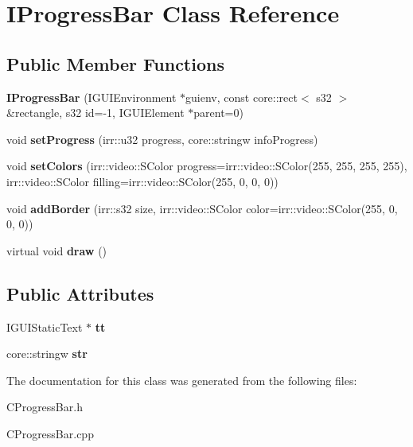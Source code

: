\hypertarget{class_i_progress_bar}{
\section{IProgressBar Class Reference}
\label{class_i_progress_bar}
}
\subsection*{Public Member Functions}
\begin{DoxyCompactItemize}
\item 
\hypertarget{class_i_progress_bar_a8fe09573b6c97fe1b82949493184a569}{
{\bfseries IProgressBar} (IGUIEnvironment $\ast$guienv, const core::rect$<$ s32 $>$ \&rectangle, s32 id=-\/1, IGUIElement $\ast$parent=0)}
\label{class_i_progress_bar_a8fe09573b6c97fe1b82949493184a569}

\item 
\hypertarget{class_i_progress_bar_a0178f12cda52d2e77b2d981518967c47}{
void {\bfseries setProgress} (irr::u32 progress, core::stringw infoProgress)}
\label{class_i_progress_bar_a0178f12cda52d2e77b2d981518967c47}

\item 
\hypertarget{class_i_progress_bar_abdfe9eec3acf019519790a0d7aefb1b6}{
void {\bfseries setColors} (irr::video::SColor progress=irr::video::SColor(255, 255, 255, 255), irr::video::SColor filling=irr::video::SColor(255, 0, 0, 0))}
\label{class_i_progress_bar_abdfe9eec3acf019519790a0d7aefb1b6}

\item 
\hypertarget{class_i_progress_bar_a64be7102178425c71475ecbbaef34583}{
void {\bfseries addBorder} (irr::s32 size, irr::video::SColor color=irr::video::SColor(255, 0, 0, 0))}
\label{class_i_progress_bar_a64be7102178425c71475ecbbaef34583}

\item 
\hypertarget{class_i_progress_bar_a52cefc000f24585f37ce2087bfe2d6c5}{
virtual void {\bfseries draw} ()}
\label{class_i_progress_bar_a52cefc000f24585f37ce2087bfe2d6c5}

\end{DoxyCompactItemize}
\subsection*{Public Attributes}
\begin{DoxyCompactItemize}
\item 
\hypertarget{class_i_progress_bar_adda963984a3d5d2e280c0cffeefe6b3e}{
IGUIStaticText $\ast$ {\bfseries tt}}
\label{class_i_progress_bar_adda963984a3d5d2e280c0cffeefe6b3e}

\item 
\hypertarget{class_i_progress_bar_a0a40a962e9a00537e66be82ef90fada9}{
core::stringw {\bfseries str}}
\label{class_i_progress_bar_a0a40a962e9a00537e66be82ef90fada9}

\end{DoxyCompactItemize}


The documentation for this class was generated from the following files:\begin{DoxyCompactItemize}
\item 
CProgressBar.h\item 
CProgressBar.cpp\end{DoxyCompactItemize}
